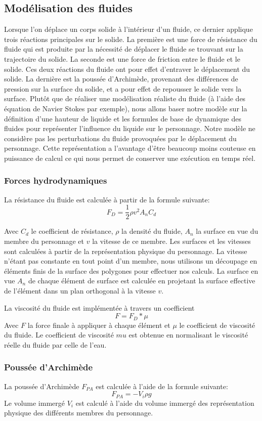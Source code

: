 \documentclass{llncs}
\begin{document}
\subsection{Modélisation des fluides}
%
Lorsque l'on déplace un corps solide à l'intérieur d'un fluide, ce dernier applique trois réactions principales sur le solide. La première est une force de résistance du fluide qui est produite par la nécessité de déplacer le fluide se trouvant sur la trajectoire du solide. La seconde est une force de friction entre le fluide et le solide. Ces deux réactions du fluide ont pour effet d'entraver le déplacement du solide. La dernière est la poussée d'Archimède, provenant des différences de pression sur la surface du solide, et a pour effet de repousser le solide vers la surface.
Plutôt que de réaliser une modélisation réaliste du fluide (à l'aide des équation de Navier Stokes par exemple), nous allons baser notre modèle sur la définition d'une hauteur de liquide et les formules de base de dynamique des fluides pour représenter l'influence du liquide sur le personnage. Notre modèle ne considère pas les perturbations du fluide provoquées par le déplacement du personnage. Cette représentation a l'avantage d'être beaucoup moins couteuse en puissance de calcul ce qui nous permet de conserver une exécution en temps réel.
%
\subsubsection{Forces hydrodynamiques}
%
La résistance du fluide est calculée à partir de la formule suivante:
\[
F_D=\frac{1}{2} \rho v^2 A_n C_d
\]


Avec \(C_d\) le coefficient de résistance, \(\rho\) la densité du fluide, \(A_n\) la surface en vue du membre du personnage et \(v\) la vitesse de ce membre. Les surfaces et les vitesses sont calculées à partir de la représentation physique du personnage. La vitesse n'étant pas constante en tout point d'un membre, nous utilisons un découpage en éléments finis de la surface des polygones pour effectuer nos calculs. La surface en vue $A_n$ de chaque élément de surface est calculée en projetant la surface effective de l'élément dans un plan orthogonal à la vitesse $v$. 

La viscosité du fluide est implémentée à travers un coefficient 
\[
F=F_D*\mu
\]
Avec $F$ la force finale à appliquer à chaque élément et \(\mu\) le coefficient de viscosité du fluide. Le coefficient de viscosité $mu$ est obtenue en normalisant le viscosité réelle du fluide par celle de l'eau.
%
\subsubsection{Poussée d'Archimède}
%
La poussée d'Archimède $F_{PA}$ est calculée à l'aide de la formule suivante:
\[
F_{PA}=-V_i \rho g
\]
Le volume immergé \(V_i\) est calculé à l'aide du volume immergé des représentation physique des différents membres du personnage.
%
\end{document}
